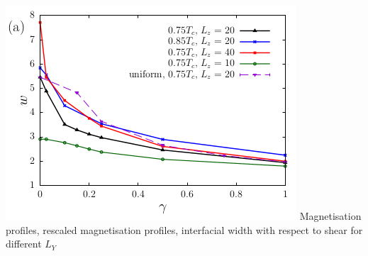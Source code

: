 \documentclass[9pt, dvipsnames]{beamer} %
\begin{document}
\begin{frame}
\begin{overprint}
\begin{columns}
		\includegraphics[width=0.9\linewidth]{smith-width.png}
	    Magnetisation profiles, rescaled magnetisation profiles, interfacial width with respect to shear for different $L_Y$
	\end{columns}
    \end{overprint}       
\end{frame}
\end{document}
